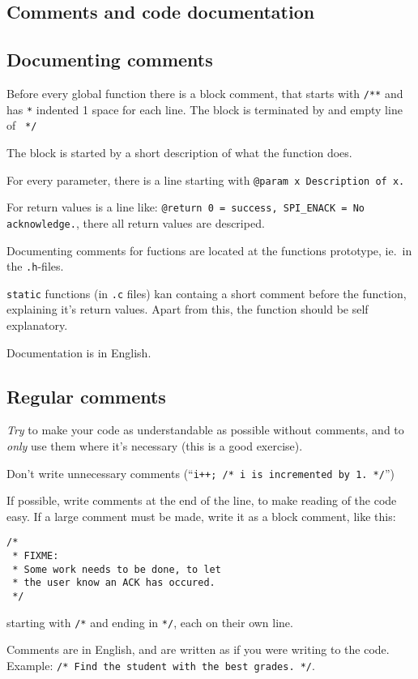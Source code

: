 \documentclass[article, 10pt]{memoir}
\let\tempone\itemize
\let\temptwo\enditemize
\renewenvironment{itemize}{\tempone\firmlist}{\temptwo}
\begin{document}
\begin{multicols}{2}
    \chapter{Comments and code documentation}

    \section{Documenting comments}
    \begin{itemize}
    \item Before every global function there is a block comment, that starts with \texttt{/**} and has \texttt{*} indented 1 space for each line. The block is terminated by and empty line of \texttt{ */}
    \item The block is started by a short description of what the function does.
    \item For every parameter, there is a line starting with \texttt{@param x Description of x.}
    \item For return values is a line like: \texttt{@return 0 = success, SPI\_ENACK = No acknowledge.}, there all return values are descriped.
    \item Documenting comments for fuctions are located at the functions prototype, ie.\ in the \texttt{.h}-files.
    \item \texttt{static} functions (in \texttt{.c} files) kan containg a short comment before the function, explaining it's return values. Apart from this, the function should be self explanatory.
    \item Documentation is in English.
    \end{itemize}

    \section{Regular comments}
    \begin{itemize}
    \item \emph{Try} to make your code as understandable as possible without comments, and to \emph{only} use them where it's necessary (this is a good exercise).
    \item Don't write unnecessary comments (``\texttt{i++; /* i is incremented by 1. */}'')
    \item If possible, write comments at the end of the line, to make reading of the code easy. If a large comment must be made, write it as a block comment, like this:
        \begin{lstlisting}
/* 
 * FIXME:
 * Some work needs to be done, to let
 * the user know an ACK has occured. 
 */
        \end{lstlisting}
        starting with \texttt{/*} and ending in \texttt{*/}, each on their own line.
    \item Comments are in English, and are written as if you were writing to the code. Example: \texttt{/* Find the student with the best grades. */}.
    \end{itemize}


\end{multicols}
\end{document}
